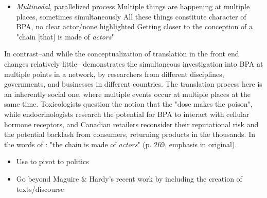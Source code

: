 \begin{itemize}
	\item \citet{Hardy2020}
		\subitem \textit{Multinodal}, parallelized process
		\subitem Multiple things are happening at multiple places, sometimes simultaneously
		\subitem All these things constitute character of BPA, no clear actor/none highlighted
		\subitem Getting closer to the conception of a "chain [that] is made of \textit{actors}" \citep[p. 269, emphasis in original]{Latour1984}
\end{itemize}

In contrast--and while the conceptualization of translation in the front end changes relatively little--\citet{Hardy2020} demonstrates the simultaneous investigation into BPA at multiple points in a network, by researchers from different disciplines, governments, and businesses in different countries. The translation process here is an inherently social one, where multiple events occur at multiple places at the same time. Toxicologists question the notion that the "dose makes the poison", while endocrinologists research the potential for BPA to interact with cellular hormone receptors, and Canadian retailers reconsider their reputational risk and the potential backlash from consumers, returning products in the thousands. In the words of \citet{Latour1984}: "the chain is made of \textit{actors}" (p. 269, emphasis in original).


\begin{itemize}
	\item Use \citet{Lok2006} to pivot to politics
	\item Go beyond Maguire \& Hardy's recent work by including the creation of texts/discourse
\end{itemize}